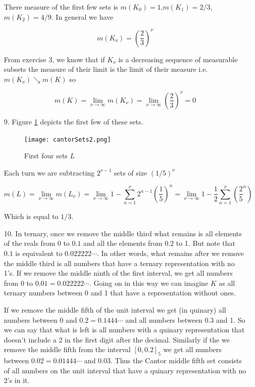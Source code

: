 \documentclass[oneside]{book}
\begin{document}
\begin{enumerate}
There measure of the first few sets is $m(K_0)=1$,$m(K_1)=2/3$,$m(K_2)=4/9$. In general we have

\begin{equation}
m(K_\nu) = \left( \frac{2}{3} \right)^{\nu}
\end{equation}

From exercise 3, we know that if $K_\nu$ is a decreasing sequence of measurable subsets the measure of their limit is the limit of their measure i.e. $m(K_\nu) \searrow m(K)$ so 

\begin{equation}
m(K) = \lim_{\nu \to \infty} m(K_\nu) = \lim_{\nu \to \infty} \left( \frac{2}{3} \right)^{\nu} = 0
\end{equation}

\item[9.] Figure \ref{fig:cantorSets2} depicts the first few of these sets.

\begin{figure}[h]
    \centering
    \texttt{[image: cantorSets2.png]}
    \caption{First four sets $L$}
    \label{fig:cantorSets2}
\end{figure}

Each turn we are subtracting $2^{\nu-1}$ sets of size $(1/5)^\nu$

\begin{equation}
m(L) = \lim_{\nu \to \infty} m(L_\nu) = \lim_{\nu \to \infty} 1 - \sum_{n=1}^\nu 2^{n-1} \left( \frac{1}{5} \right)^{n} = \lim_{\nu \to \infty} 1 - \frac{1}{2} \sum_{n=1}^\nu \left( \frac{2}{5}^n \right)
\end{equation}

Which is equal to $1/3$.

\item[10.] In ternary, once we remove the middle third what remains is all elements of the reals from 0 to $0.1$ and all the elements from $0.2$ to 1. But note that $0.1$ is equivalent to $0.022222\cdots$. In other words, what remains after we remove the middle third is all numbers that have a ternary representation with no 1's. If we remove the middle ninth of the first interval, we get all numbers from $0$ to $0.01=0.022222\cdots$. Going on in this way we can imagine $K$ as all ternary numbers between 0 and 1 that have a representation without ones. 

If we remove the middle fifth of the unit interval we get (in quinary) all numbers between 0 and $0.2=0.1444\cdots$ and all numbers between $0.3$ and 1. So we can say that what is left is all numbers with a quinary representation that doesn't include a 2 in the first digit after the decimal. Similarly if the we remove the middle fifth from the interval $[0,0.2]_5$ we get all numbers between $0.02=0.01444\cdots$ and $0.03$. Thus the Cantor middle fifth set consists of all numbers on the unit interval that have a quinary representation with no 2's in it.


\end{enumerate}
\end{document}
